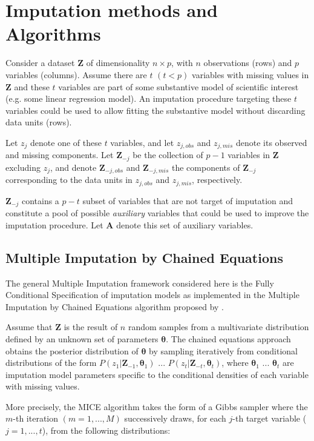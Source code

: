 \section{Imputation methods and Algorithms}

Consider a dataset $\bm{Z}$ of dimensionality $n \times p$, with $n$ observations (rows) and 
$p$ variables (columns).
Assume there are $t$ $(t<p)$ variables with missing values in $\bm{Z}$ and these $t$ variables
are part of some substantive model of scientific interest (e.g. some linear regression model).
An imputation procedure targeting these $t$ variables could be used to allow fitting the 
substantive model without discarding data units (rows).

Let $z_j$ denote one of these $t$ variables, and let $z_{j, obs}$ and $z_{j, mis}$ denote its 
observed and missing components.
Let $\bm{Z}_{-j}$ be the collection of $p-1$ variables in $\bm{Z}$ excluding $z_j$, and denote
$\bm{Z}_{-j, obs}$ and $\bm{Z}_{-j, mis}$ the components of $\bm{Z}_{-j}$ corresponding to the
data units in $z_{j, obs}$ and $z_{j, mis}$, respectively.

$\bm{Z}_{-j}$ contains a $p-t$ subset of variables that are not target of imputation 
and constitute a pool of possible \emph{auxiliary} variables that could be used to improve the 
imputation procedure.
Let $\bm{A}$ denote this set of auxiliary variables.

\subsection{Multiple Imputation by Chained Equations}

The general Multiple Imputation framework considered here is the Fully Conditional Specification of
imputation models as implemented in the Multiple Imputation by Chained Equations algorithm
proposed by \cite{mice}.

Assume that $\bm{Z}$ is the result of $n$ random samples from a multivariate distribution defined by 
an unknown set of parameters $\bm{\theta}$.
The chained equations approach obtains the posterior distribution of $\bm{\theta}$ by sampling iteratively 
from conditional distributions of the form $P(z_{1}|\bm{Z}_{-1}, \bm{\theta}_{1})$ $...$ 
$P(z_{t}|\bm{Z}_{-t}, \bm{\theta}_{t})$, where $\bm{\theta}_{1}$ $...$ $\bm{\theta}_{t}$ are imputation model 
parameters specific to the conditional densities of each variable with missing values.

More precisely, the MICE algorithm takes the form of a Gibbs sampler where the $m$-th iteration $(m = 1, ..., M)$
successively draws, for each $j$-th target variable ($j = 1, ..., t$), from the following distributions:

